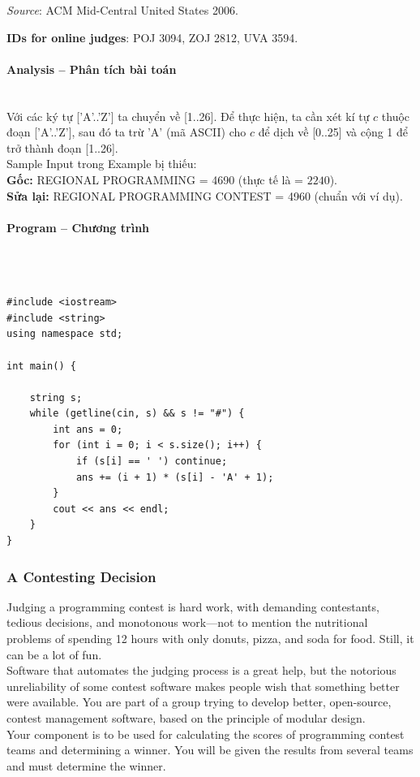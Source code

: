 \documentclass{article}
\begin{document}
\textit{Source}: ACM Mid-Central United States 2006.

\textbf{IDs for online judges}: POJ 3094, ZOJ 2812, UVA 3594.


\paragraph{Analysis -- Phân tích bài toán} \mbox{} \\

Với các ký tự ['A'..'Z'] ta chuyển về [1..26]. Để thực hiện, ta cần xét kí tự $c$ thuộc đoạn ['A'..'Z'], sau đó ta trừ 'A' (mã ASCII) cho $c$ để dịch về [0..25] và cộng 1 để trở thành đoạn [1..26]. \\

Sample Input trong Example bị thiếu:\\
\textbf{Gốc:} REGIONAL PROGRAMMING = 4690 (thực tế là = $2240$). \\
\textbf{Sửa lại:} REGIONAL PROGRAMMING CONTEST = 4960 (chuẩn với ví dụ).

\paragraph{Program -- Chương trình} \mbox{} \\


\begin{lstlisting}

#include <iostream>
#include <string>
using namespace std;
	
int main() {
	
	string s;
	while (getline(cin, s) && s != "#") {
		int ans = 0;
		for (int i = 0; i < s.size(); i++) {
			if (s[i] == ' ') continue;
			ans += (i + 1) * (s[i] - 'A' + 1);
		}
		cout << ans << endl;
	}
}

\end{lstlisting}


\subsubsection{A Contesting Decision}

Judging a programming contest is hard work, with demanding contestants, tedious decisions, and monotonous work—not to mention the nutritional problems of spending 12 hours with only donuts, pizza, and soda for food. Still, it can be a lot of fun.\\
Software that automates the judging process is a great help, but the notorious unreliability of some contest software makes people wish that something better were available. You are part of a group trying to develop better, open-source, contest management software, based on the principle of modular design. \\
Your component is to be used for calculating the scores of programming contest teams and determining a winner. You will be given the results from several teams and must determine the winner. \\
\end{document}
